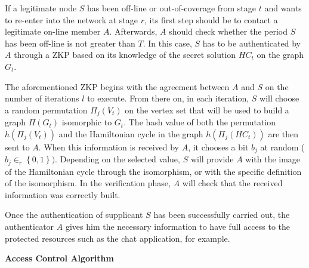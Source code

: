 \documentclass{article}
\begin{document}
If a legitimate node $S$ has been off-line
or out-of-coverage from stage $t$ and wants to re-enter into the
network at stage $r$, its first step should be to contact a
legitimate on-line member $A$. Afterwards, $A$ should check
whether the period $S$ has been off-line is not greater than $T$. In
this case, $S$ has to be authenticated by $A$ through a ZKP based on its
knowledge of the secret solution $HC_t$ on the graph $G_t$.

The aforementioned ZKP begins with the agreement between $A$ and
$S$ on the number of iterations $l$ to execute. From there on, in
each iteration, $S$ will choose a random permutation
${\Pi}_j(V_t)$ on the vertex set that will be used to build a
graph ${\Pi}(G_t)$ isomorphic to $G_t$. The hash value of both the
permutation $h({\Pi}_j(V_t))$ and the Hamiltonian cycle in the
graph  $h({\Pi}_j(HC_t))$ are then sent to $A$. When this
information is received by $A$, it chooses a bit $b_j$ at random
($b_j \in_r \left\{0,1\right \}) $. Depending on the selected
value, $S$ will provide $A$ with the image  of the Hamiltonian
cycle through the isomorphism, or with the specific definition of
the isomorphism. In the verification phase, $A$ will check that
the received information was correctly built.

Once the authentication of supplicant $S$ has been successfully
carried out, the authenticator $A$ gives him the necessary
information to have full access to the protected resources such as
the chat application, for example.

{\bf Access Control Algorithm}
\end{document}
